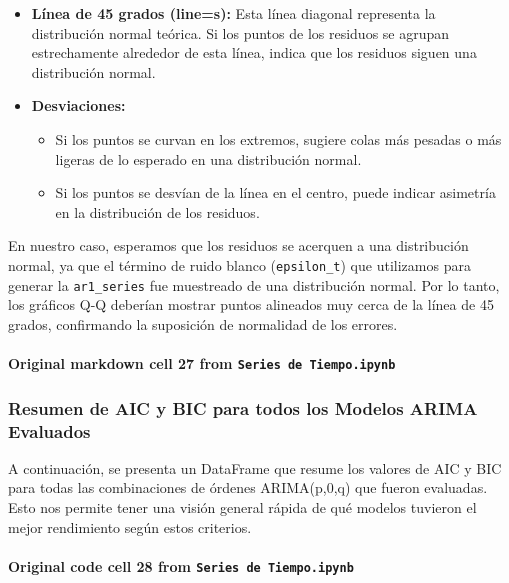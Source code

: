 \documentclass[
  11pt,
]{article}
\providecommand{\tightlist}{%
  \setlength{\itemsep}{0pt}\setlength{\parskip}{0pt}}
\begin{document}
\begin{itemize}
\tightlist
\item
  \textbf{Línea de 45 grados (line=\textquotesingle s\textquotesingle):} Esta línea diagonal representa la distribución normal teórica. Si los puntos de los residuos se agrupan estrechamente alrededor de esta línea, indica que los residuos siguen una distribución normal.
\item
  \textbf{Desviaciones:}

  \begin{itemize}
  \tightlist
  \item
    Si los puntos se curvan en los extremos, sugiere colas más pesadas o más ligeras de lo esperado en una distribución normal.
  \item
    Si los puntos se desvían de la línea en el centro, puede indicar asimetría en la distribución de los residuos.
  \end{itemize}
\end{itemize}

En nuestro caso, esperamos que los residuos se acerquen a una distribución normal, ya que el término de ruido blanco (\texttt{epsilon\_t}) que utilizamos para generar la \texttt{ar1\_series} fue muestreado de una distribución normal. Por lo tanto, los gráficos Q-Q deberían mostrar puntos alineados muy cerca de la línea de 45 grados, confirmando la suposición de normalidad de los errores.

\paragraph{\texorpdfstring{Original markdown cell 27 from \texttt{Series\ de\ Tiempo.ipynb}}{Original markdown cell 27 from Series de Tiempo.ipynb}}\label{original-markdown-cell-27-from-series-de-tiempoipynb}

\subsubsection{Resumen de AIC y BIC para todos los Modelos ARIMA Evaluados}\label{resumen-de-aic-y-bic-para-todos-los-modelos-arima-evaluados}

A continuación, se presenta un DataFrame que resume los valores de AIC y BIC para todas las combinaciones de órdenes ARIMA(p,0,q) que fueron evaluadas. Esto nos permite tener una visión general rápida de qué modelos tuvieron el mejor rendimiento según estos criterios.

\paragraph{\texorpdfstring{Original code cell 28 from \texttt{Series\ de\ Tiempo.ipynb}}{Original code cell 28 from Series de Tiempo.ipynb}}\label{original-code-cell-28-from-series-de-tiempoipynb}
\end{document}
